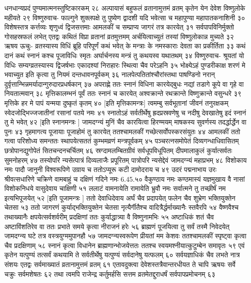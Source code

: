 धनधान्यप्रदं पुण्यमात्मनस्तुष्टिकारकम् २८
अल्पायासं बहुफलं व्रतानामुत्तमं व्रतम् 
कृतेन येन देवेश विष्णुलोके महीयते २९
विष्णुरुवाच-
फाल्गुने शुक्लपक्षे तु पुष्येण द्वादशी यदि 
भवेत्सा च महापुण्या महापातकनाशिनी ३०
विशेषस्तत्र कर्त्तव्यः शृणुध्वं द्विजसत्तमाः 
आमलकीं च सम्प्राप्य जागरं तत्र कारयेत् ३१
सर्वपापविनिर्मुक्तो गोसहस्रफलं लभेत् 
एतद्वः कथितं विप्रा व्रतानां व्रतमुत्तमम् 
अर्चयित्वाच्युतं तस्यां विष्णुलोकान्न मुच्यते ३२
ऋषय ऊचुः-
व्रतस्यास्य विधिं ब्रूहि परिपूर्णं कथं भवेत् 
के मन्त्राः के नमस्काराः देवता का प्रकीर्तिता ३३
कथं दानं कथं स्नानं कश्च पूजाविधिः स्मृतः 
अर्घार्चनस्य मन्त्रं तु कथयस्व यथातथम् ३४
विष्णुरुवाच-
श्रूयतां यो विधिः सम्यग्व्रतस्यास्य द्विजर्षभाः 
एकादश्यां निराहारः स्थित्वा चैव परेऽहनि ३५
भोक्ष्येऽहं पुण्डरीकाक्ष शरणं मे भवाच्युत 
इति कृत्वा तु नियमं दन्तधावनपूर्वकम् ३६
नालपेत्पतितांश्चौरांस्तथा पाषण्डिनो नरान् 
दुर्वृत्तान्भिन्नमर्यादान्गुरुदारप्रधर्षकान् ३७
अपराह्णे ततः स्नानं विधिना कारयेद्बुधः 
नद्यां तडागे कूपे वा गृहे वा नियतात्मवान् ३८
मृत्तिकालम्भनं पूर्वं ततः स्नानं च कारयेत् 
अश्वक्रान्ते रथक्रान्ते विष्णुक्रान्ते वसुन्धरे ३९
मृत्तिके हर मे पापं यन्मया दुष्कृतं कृतम् ४० 
[इति मृत्तिकामन्त्रः]
त्वमम्बु सर्वभूतानां जीवनं तनुरक्षकम् 
स्वेदजोद्भिज्जजातीनां रसानां पतये नमः ४१
स्नातोऽहं सर्वतीर्थेषु ह्रदप्रस्रवणेषु च 
नदीषु देवखातेषु इदं स्नानं तु मे भवेत् ४२
[इति स्नानमन्त्रः ]
जामदग्न्यं मुनिं चैव कारयित्वा हिरण्मयम् 
माषकस्य सुवर्णस्य तदर्द्धार्द्धेन वा पुनः ४३
गृहमागत्य पूजायाः पूजाहोमं तु कारयेत् 
ततश्चामलकीं गच्छेत्सर्वोपस्करसंयुतः ४४
आमलकीं ततो गत्वा परिशोध्य समन्ततः 
स्थापयेत्सततं कुम्भमव्रणं मन्त्रपूर्वकम् ४५
पञ्चरत्नसमोपेतं दिव्यगन्धाधिवासितम् 
छत्रोपानद्युगोपेतं सितचन्दनचर्चितम् ४६
स्रग्दामलम्बितग्रीवं सर्वधूपविधूपितम् 
दीपमालाकुलं कुर्यात्सर्वतः सुमनोहरम् ४७
तस्योपरि न्यसेत्पात्रं दिव्यलाजैः प्रपूरितम् 
पात्रोपरि न्यसेद्देवं जामदग्न्यं महाप्रभम् ४८
विशोकाय नमः पादौ जानुनी विश्वरूपिणे 
उग्राय च ततोऽप्यूरू कटी दामोदराय च ४९
उदरं पद्मनाभाय उरः श्रीवत्सधारिणे 
चक्रिणे वामबाहुं च दक्षिणं गदिने नमः 6.45.५०
वैकुण्ठाय नमः कण्ठमास्यं यज्ञमुखाय वै 
नासां विशोकनिधये वासुदेवाय चाक्षिणी ५१
ललाटं वामनायेति रामायेति भ्रुवौ नमः 
सर्वात्मने तु तच्छीर्षं नम इत्यभिपूजयेत् ५२
[इति पूजामन्त्रः ]
ततो देवाधिदेवाय अर्घं चैव प्रदापयेत् 
फलेन चैव शुभ्रेण भक्तियुक्तेन चेतसा ५३
ततो जागरणं कुर्याद्भक्तियुक्तेन चेतसा 
नृत्यैर्गीतैश्च वादित्रैर्द्धर्माख्यानैः स्तवैरपि ५४
वैष्णवैश्च तथाख्यानैः क्षपयेत्सर्वशर्वरीम् 
प्रदक्षिणां ततः कुर्याद्धात्र्या वै विष्णुनामभिः ५५
अष्टाधिकं शतं चैव अष्टाविंशतिरेव वा 
ततः प्रभाते समये कृत्वा नीराजनं हरेः ५६
ब्राह्मणं पूजयित्वा तु सर्वं तस्मै निवेदयेत् 
जामदग्न्य घटे तत्र वस्त्रयुग्ममुपानहौ ५७
जामदग्न्यस्वरूपेण प्रीयतां मम केशवः 
ततश्चामलकीं स्पृष्ट्वा कृत्वा चैव प्रदक्षिणाम् ५८
स्नानं कृत्वा विधानेन ब्राह्मणान्भोजयेत्ततः 
ततश्च स्वयमश्नीयात्कुटुम्बेन समावृतः ५९
एवं कृतेन यत्पुण्यं तत्सर्वं कथयामि ते 
सर्वतीर्थेषु यत्पुण्यं सर्वदानेषु यत्फलम् ६०
सर्वयज्ञाधिकं चैव लभते नात्र संशयः 
एतद्वः सर्वमाख्यातं व्रतानामुत्तमं व्रतम् ६१
एतावदुक्त्वा देवेशस्तत्रैवान्तरधीयत 
ते चापि ऋषयः सर्वे चक्रुः सर्वमशेषतः ६२
तथा त्वमपि राजेन्द्र कर्तुमर्हसि सत्तम 
व्रतमेतद्दुराधर्षं सर्वपापप्रमोचनम् ६३

